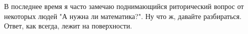В последнее время я часто замечаю поднимающийся риторический вопрос от некоторых людей "А нужна ли математика?".
Ну что ж, давайте разбираться.
Ответ, как всегда, лежит на поверхности.